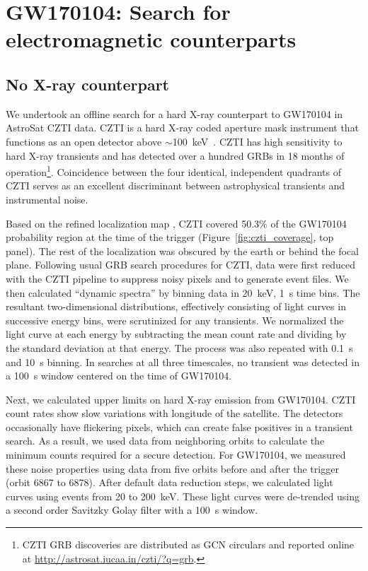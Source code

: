 \documentclass[twocolumn]{aastex6}
\begin{document}
\section{GW170104: Search for electromagnetic counterparts}


\subsection{No X-ray counterpart}\label{subsec:xraygw}
We undertook an offline search for a hard X-ray counterpart to GW170104 in AstroSat CZTI data. CZTI is a hard X-ray coded aperture mask instrument that functions as an open detector above $\sim$100~keV~\citep{bbv+16}. CZTI has high sensitivity to hard X-ray transients and has detected over a hundred GRBs in 18 months of operation\footnote{CZTI GRB discoveries are distributed as GCN circulars and reported online at \url{http://astrosat.iucaa.in/czti/?q=grb}.}. Coincidence between the four identical, independent quadrants of CZTI serves as an excellent discriminant between astrophysical transients and instrumental noise.

Based on the refined localization map \citep{GW170104_finalskymap}, CZTI covered 50.3\% of the GW170104 probability region at the time of the trigger (Figure~\ref{fig:czti_coverage}, top panel). The rest of the localization was obscured by the earth or behind the focal plane. Following usual GRB search procedures for CZTI, data were first reduced with the CZTI pipeline to suppress noisy pixels and to generate event files. We then calculated ``dynamic spectra'' by binning data in 20~keV, 1~s time bins. The resultant two-dimensional distributions, effectively consisting of light curves in successive energy bins, were scrutinized for any transients. We normalized the light curve at each energy by subtracting the mean count rate and dividing by the standard deviation at that energy. The process was also repeated with 0.1~s and 10~s binning. In searches at all three timescales, no transient was detected in a 100~s window centered on the time of GW170104.

Next, we calculated upper limits on hard X-ray emission from GW170104. CZTI count rates show slow variations with longitude of the satellite. The detectors occasionally have flickering pixels, which can create false positives in a transient search. As a result, we used data from neighboring orbits to calculate the minimum counts required for a secure detection. For GW170104, we measured these noise properties using data from five orbits before and after the trigger (orbit 6867 to 6878). After default data reduction steps, we calculated light curves using events from 20 to 200~keV. These light curves were de-trended using a second order Savitzky Golay filter with a 100~s window.
\end{document}
